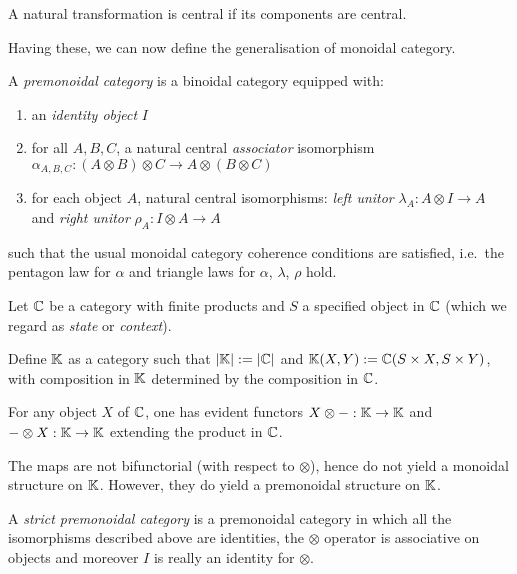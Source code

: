 A natural transformation is central if its components are central.

Having these, we can now define the generalisation of monoidal category.

\begin{definition}
    A \emph{premonoidal category} is a binoidal category equipped with:
    \begin{enumerate}
        \item an \emph{identity object} $I$
        \item for all $A, B, C$, a natural central \emph{associator}
            isomorphism $\alpha_{A,B,C}\colon (A \otimes B) \otimes C \to A
            \otimes (B \otimes C)$
        \item for each object $A$, natural central isomorphisms: \emph{left
            unitor} $\lambda_A\colon A \otimes I \to A$ and \emph{right unitor}
            $\rho_A\colon I \otimes A \to A$
    \end{enumerate}

    such that the usual monoidal category coherence conditions are satisfied,
    i.e.~the pentagon law for $\alpha$ and triangle laws for $\alpha$,
    $\lambda$, $\rho$ hold.

\end{definition}

\begin{example}
    Let $\mathbb{C}$ be a category with finite products and $S$ a specified object
    in $\mathbb{C}$ (which we regard as \emph{state} or \emph{context}).

    Define $\mathbb{K}$ as a category such that $|\mathbb{K}| := |\mathbb{C}|$ and
    $\mathbb{K}(X, Y) := \mathbb{C}(S \times X, S \times Y)$, with composition in
    $\mathbb{K}$ determined by the composition in $\mathbb{C}$.

    For any object $X$ of $\mathbb{C}$, one has evident functors
    $X \otimes -: \mathbb{K} \to \mathbb{K}$ and
    $- \otimes X: \mathbb{K} \to \mathbb{K}$ extending the product in $\mathbb{C}$.

    The maps are not bifunctorial (with respect to $\otimes$), hence do not
    yield a monoidal structure on $\mathbb{K}$. However, they do  yield a
    premonoidal structure on $\mathbb{K}$.
\end{example}

A \emph{strict premonoidal category} is a premonoidal category in which all the
isomorphisms described above are identities, the $\otimes$ operator is
associative on objects and moreover $I$ is really an identity for $\otimes$.

